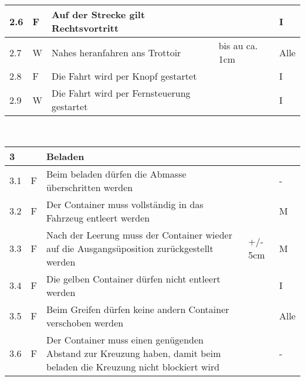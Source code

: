 \begin{center}
\begin{tabular}{|p{1cm}|p{0.5cm}|p{5cm}|p{5cm}|p{1.5cm}|}
 2.6 & F & Auf der Strecke gilt Rechtsvortritt & & I \\\hline
 2.7 & W & Nahes heranfahren ans Trottoir & bis au ca. 1cm & Alle\\\hline
 2.8 & F & Die Fahrt wird per Knopf gestartet & & I\\\hline
 2.9 & W & Die Fahrt wird per Fernsteuerung gestartet & & I \\\hline
\end{tabular}\\[0.3cm]
\begin{tabular}{|p{1cm}|p{0.5cm}|p{5cm}|p{5cm}|p{1.5cm}|}\hline
 \textbf{3} & & \textbf{Beladen} & & \\\hline
 3.1 & F & Beim beladen dürfen die Abmasse überschritten werden & & -\\\hline
 3.2 & F & Der Container muss vollständig in das Fahrzeug entleert werden & & M\\\hline
 3.3 & F & Nach der Leerung muss der Container wieder auf die Ausgangsüposition zurückgestellt werden & +/- 5cm & M\\\hline
 3.4 & F & Die gelben Container dürfen nicht entleert werden & & I\\\hline
 3.5 & F & Beim Greifen dürfen keine andern Container verschoben werden & & Alle\\\hline
 3.6 & F & Der Container muss einen genügenden Abstand zur Kreuzung haben, damit beim beladen die Kreuzung nicht blockiert wird & & - \\\hline   
\end{tabular}
\end{center}
